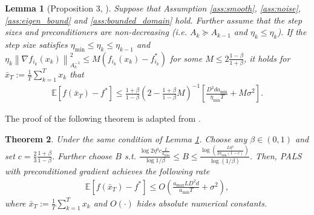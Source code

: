 \documentclass{article}
\newtheorem{theorem}{Theorem}
\newtheorem{lemma}[theorem]{Lemma}
\newcommand{\EE}{\mathbb{E}}
\newcommand{\norm}[1]{\left \lVert #1 \right \rVert}
\begin{document}

\begin{lemma}[Proposition 3, \citet{vaswani2020adaptive}] \label{lem:prop3} Suppose that Assumption \ref{ass:smooth}, \ref{ass:noise}, \ref{ass:eigen_bound} and \ref{ass:bounded_domain} hold. Further assume that the step sizes and preconditioners are non-decreasing (i.e. $A_k \succeq A_{k-1}$ and $\eta_k \leq \eta_k$). If the step size satisfies $\eta_{\min} \leq \eta_k \leq \eta_{k-1}$ and $\eta_k \norm{\nabla f_{i_k}(x_k)}_{A_k^{-1}}^2 \leq M (f_{i_k} (x_k) -f^*_{i_k})$ for some $M \leq 2 \frac{1 - \beta}{1+ \beta}$, it holds  for $\bar{x}_T := \frac{1}{T} \sum_{k=1}^T x_k$ that
\begin{align*}
    \EE[f(\bar{x}_T) - f^*] \leq \frac{1 + \beta}{1 - \beta}(2 - \frac{1 + \beta}{1 - \beta}M)^{-1}[\frac{D^2 d a_{\min}}{\eta_{\min} T} + M \sigma^2].
\end{align*}
    
\end{lemma}

The proof of the following theorem is adapted from \citet{vaswani2020adaptive}. 
\begin{theorem} \label{thm:adam} Under the same condition of Lemma \ref{lem:prop3}. Choose any $\beta \in (0,1)$ and set $c = \frac{2}{3} \frac{1 + \beta}{1 - \beta}$. Further choose $B$ s.t. $\frac{\log 2 \eta^0 c \frac{L}{a_{\min}}}{\log 1 / \beta} \leq B \leq \frac{\log(\frac{L \eta^0}{2 a_{\min} (1-c)})}{\log(1/\beta)}$. Then, PALS with preconditioned gradient achieves the following rate
\begin{align*}
    \EE[f(\bar{x}_T) - f^*] \leq O(\frac{a_{\max} L D^2 d}{a_{\min}T} + \sigma^2),
\end{align*}
    where $\bar{x}_T := \frac{1}{T} \sum_{k=1}^T x_k$ and $O(\cdot)$ hides absolute numerical constants. 
\end{theorem}
\end{document}
